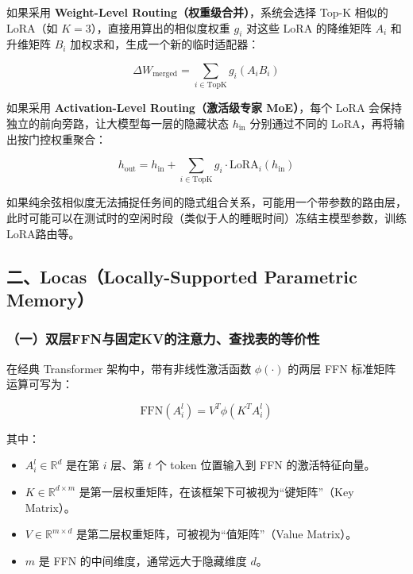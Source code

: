 如果采用 \textbf{Weight-Level Routing（权重级合并）}，系统会选择 Top-K 相似的 LoRA（如 \(K=3\)），直接用算出的相似度权重 \(g_i\) 对这些 LoRA 的降维矩阵 \(A_i\) 和升维矩阵 \(B_i\) 加权求和，生成一个新的临时适配器：

\[
\Delta W_{\mathrm{merged}} =
\sum_{i\in \mathrm{TopK}} g_i(A_iB_i)
\]

如果采用 \textbf{Activation-Level Routing（激活级专家 MoE）}，每个 LoRA 会保持独立的前向旁路，让大模型每一层的隐藏状态 \(h_{\mathrm{in}}\) 分别通过不同的 LoRA，再将输出按门控权重聚合：

\[
h_{\mathrm{out}} =
h_{\mathrm{in}} +
\sum_{i\in \mathrm{TopK}} g_i \cdot \mathrm{LoRA}_i(h_{\mathrm{in}})
\]

如果纯余弦相似度无法捕捉任务间的隐式组合关系，可能用一个带参数的路由层，此时可能可以在测试时的空闲时段（类似于人的睡眠时间）冻结主模型参数，训练LoRA路由等。

\hypertarget{ux4e8clocaslocally-supported-parametric-memory}{%
\subsection{二、Locas（Locally-Supported Parametric Memory）}\label{ux4e8clocaslocally-supported-parametric-memory}}

\hypertarget{ux4e00ux53ccux5c42ffnux4e0eux56faux5b9akvux7684ux6ce8ux610fux529bux67e5ux627eux8868ux7684ux7b49ux4ef7ux6027}{%
\subsubsection{（一）双层FFN与固定KV的注意力、查找表的等价性}\label{ux4e00ux53ccux5c42ffnux4e0eux56faux5b9akvux7684ux6ce8ux610fux529bux67e5ux627eux8868ux7684ux7b49ux4ef7ux6027}}

在经典 Transformer 架构中，带有非线性激活函数 \(\phi(\cdot)\) 的两层 FFN 标准矩阵运算可写为：

\[
\mathrm{FFN}(A_i^l)=V^T\phi(K^T A_i^l)
\]

其中：

\begin{itemize}
\tightlist
\item
  \(A_i^l \in \mathbb{R}^d\) 是在第 \(i\) 层、第 \(t\) 个 token 位置输入到 FFN 的激活特征向量。
\item
  \(K\in \mathbb{R}^{d\times m}\) 是第一层权重矩阵，在该框架下可被视为``键矩阵''（Key Matrix）。
\item
  \(V\in \mathbb{R}^{m\times d}\) 是第二层权重矩阵，可被视为``值矩阵''（Value Matrix）。
\item
  \(m\) 是 FFN 的中间维度，通常远大于隐藏维度 \(d\)。
\end{itemize}

